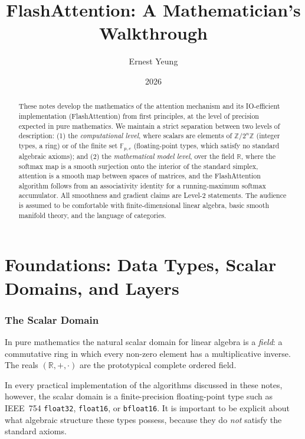 \documentclass[11pt]{amsart}
\title{FlashAttention: A Mathematician's Walkthrough}
\author{Ernest Yeung}
\date{2026}
\theoremstyle{plain}
\theoremstyle{definition}
\begin{document}
\begin{abstract}
These notes develop the mathematics of the attention mechanism and its
IO-efficient implementation (FlashAttention) from first principles, at the
level of precision expected in pure mathematics.  We maintain a strict
separation between two levels of description: (1) the \emph{computational level},
where scalars are elements of $\mathbb{Z}/2^n\mathbb{Z}$ (integer types, a ring)
or of the finite set $\mathbb{F}_{p,e}$ (floating-point types, which satisfy no
standard algebraic axioms); and (2) the \emph{mathematical model level}, over the
field $\mathbb{R}$, where the softmax map is a smooth surjection onto the interior
of the standard simplex, attention is a smooth map between spaces of matrices,
and the FlashAttention algorithm follows from an associativity identity for a
running-maximum softmax accumulator.  All smoothness and gradient claims are
Level-2 statements.  The audience is assumed to be comfortable with
finite-dimensional linear algebra, basic smooth manifold theory, and the language
of categories.
\end{abstract}

\maketitle

\tableofcontents

\part{Foundations: Data Types, Scalar Domains, and Layers}
\label{part:foundations}

\section{The Scalar Domain}
\label{sec:scalars}

In pure mathematics the natural scalar domain for linear algebra is a
\emph{field}: a commutative ring in which every non-zero element has a
multiplicative inverse.  The reals $(\mathbb{R}, +, \cdot)$ are the prototypical
complete ordered field.

In every practical implementation of the algorithms discussed in these notes,
however, the scalar domain is a finite-precision floating-point type such as
IEEE~754 \texttt{float32}, \texttt{float16}, or \texttt{bfloat16}.  It is
important to be explicit about what algebraic structure these types possess,
because they do \emph{not} satisfy the standard axioms.
\end{document}
